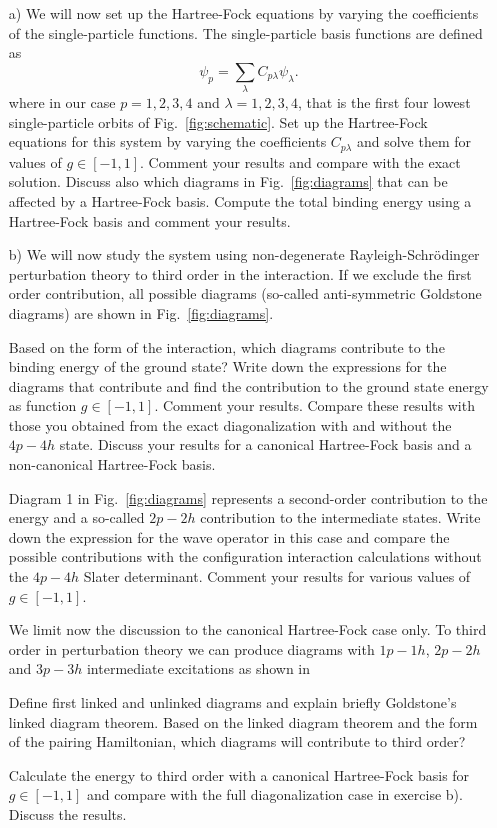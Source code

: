   \begin{prob}\label{problem:prob8.5}
  \begin{enumerate}
  \item[a)] We will now set up the Hartree-Fock equations by varying
    the coefficients of the single-particle functions. The
    single-particle basis functions are defined as
  \[
  \psi_p = \sum_{\lambda} C_{p\lambda}\psi_{\lambda}.
  \]
  where in our case $p=1,2,3,4$ and $\lambda=1,2,3,4$, that is the
  first four lowest single-particle orbits of
  Fig.~\ref{fig:schematic}.  Set up the Hartree-Fock equations for
  this system by varying the coefficients $C_{p\lambda}$ and solve
  them for values of $g\in [-1,1]$.  Comment your results and compare
  with the exact solution. Discuss also which diagrams in
  Fig.~\ref{fig:diagrams} that can be affected by a Hartree-Fock
  basis. Compute the total binding energy using a Hartree-Fock basis
  and comment your results.

  \item[b)] We will now study the system using non-degenerate
    Rayleigh-Schr\"odinger perturbation theory to third order in the
    interaction.  If we exclude the first order contribution, all
    possible diagrams (so-called anti-symmetric Goldstone diagrams)
    are shown in Fig.~\ref{fig:diagrams}.


  Based on the form of the interaction, which diagrams contribute to
  the binding energy of the ground state?  Write down the expressions
  for the diagrams that contribute and find the contribution to the
  ground state energy as function $g\in [-1,1]$. Comment your results.
  Compare these results with those you obtained from the exact
  diagonalization with and without the $4p-4h$ state.  Discuss your
  results for a canonical Hartree-Fock basis and a non-canonical
  Hartree-Fock basis.


  Diagram 1 in Fig.~\ref{fig:diagrams} represents a second-order
  contribution to the energy and a so-called $2p-2h$ contribution to
  the intermediate states. Write down the expression for the wave
  operator in this case and compare the possible contributions with
  the configuration interaction calculations without the $4p-4h$
  Slater determinant. Comment your results for various values of $g\in
  [-1,1]$.

  We limit now the discussion to the canonical Hartree-Fock case
  only. To third order in perturbation theory we can produce diagrams
  with $1p-1h$, $2p-2h$ and $3p-3h$ intermediate excitations as shown in


  Define first linked and unlinked diagrams and explain briefly
  Goldstone's linked diagram theorem.  Based on the linked diagram
  theorem and the form of the pairing Hamiltonian, which diagrams will
  contribute to third order?

  Calculate the energy to third order with a canonical Hartree-Fock
  basis for $g\in [-1,1]$ and compare with the full diagonalization
  case in exercise b). Discuss the results.
  \end{enumerate}



  \end{prob}


